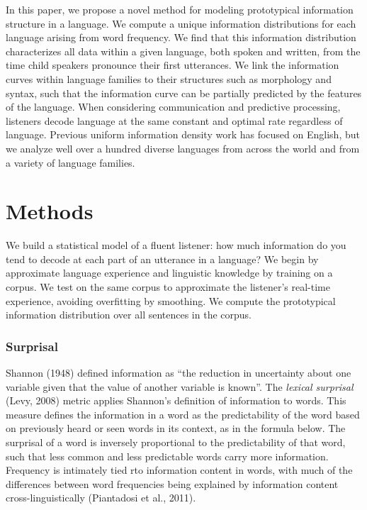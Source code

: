 \documentclass[10pt, letterpaper]{article}
\begin{document}
In this paper, we propose a novel method for modeling prototypical
information structure in a language. We compute a unique information
distributions for each language arising from word frequency. We find
that this information distribution characterizes all data within a given
language, both spoken and written, from the time child speakers
pronounce their first utterances. We link the information curves within
language families to their structures such as morphology and syntax,
such that the information curve can be partially predicted by the
features of the language. When considering communication and predictive
processing, listeners decode language at the same constant and optimal
rate regardless of language. Previous uniform information density work
has focused on English, but we analyze well over a hundred diverse
languages from across the world and from a variety of language families.

\hypertarget{methods}{%
\section{Methods}\label{methods}}

We build a statistical model of a fluent listener: how much information
do you tend to decode at each part of an utterance in a language? We
begin by approximate language experience and linguistic knowledge by
training on a corpus. We test on the same corpus to approximate the
listener's real-time experience, avoiding overfitting by smoothing. We
compute the prototypical information distribution over all sentences in
the corpus.

\hypertarget{surprisal}{%
\subsubsection{Surprisal}\label{surprisal}}

Shannon (1948) defined information as ``the reduction in uncertainty
about one variable given that the value of another variable is known''.
The \emph{lexical surprisal} (Levy, 2008) metric applies Shannon's
definition of information to words. This measure defines the information
in a word as the predictability of the word based on previously heard or
seen words in its context, as in the formula below. The surprisal of a
word is inversely proportional to the predictability of that word, such
that less common and less predictable words carry more information.
Frequency is intimately tied rto information content in words, with much
of the differences between word frequencies being explained by
information content cross-linguistically (Piantadosi et al., 2011).
\end{document}
